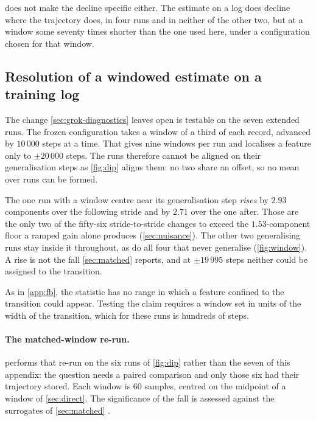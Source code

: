 \documentclass[twoside]{article}
\begin{document}
 does not make the decline specific either. The estimate on a log does decline where the
trajectory does, in four runs and in neither of the other two, but at a window some seventy times
shorter than the one used here, under a configuration chosen for that window.

\subsection{Resolution of a windowed estimate on a training log}\label{app:window}

The change \cref{sec:grok-diagnostics} leaves open is testable on the seven extended runs. The
frozen configuration takes a window of a third of each record, advanced by $10\,000$ steps at a
time. That gives nine windows per run and localises a feature only to $\pm 20\,000$ steps. The runs therefore cannot be aligned on
their generalisation steps as \cref{fig:dip} aligns them: no two share an offset, so no mean over
runs can be formed.

The one run with a window centre near its generalisation step \emph{rises} by $2.93$ components
over the following stride and by $2.71$ over the one after. Those are the only two of the
fifty-six stride-to-stride changes to exceed the $1.53$-component floor a ramped gain alone
produces (\cref{sec:nuisance}). The other two generalising runs stay inside it throughout, as do
all four that never generalise (\cref{fig:window}). A rise is not the fall \cref{sec:matched}
reports, and at $\pm 19\,995$ steps neither could be assigned to the transition.

As in \cref{app:fb}, the statistic has no range in which a feature confined to the transition could
appear. Testing the claim requires a window set in units of the width of the transition, which for
these runs is hundreds of steps.

\paragraph{The matched-window re-run.}  performs that re-run on the six runs of
\cref{fig:dip} rather than the seven of this appendix: the question needs a paired comparison and
only those six had their trajectory stored. Each window is $60$ samples, centred on the midpoint of
a window of \cref{sec:direct}. The significance of the fall is assessed against the surrogates of
\cref{sec:matched} \citep{theiler1992testing, schreiber1996improved}.
\end{document}
